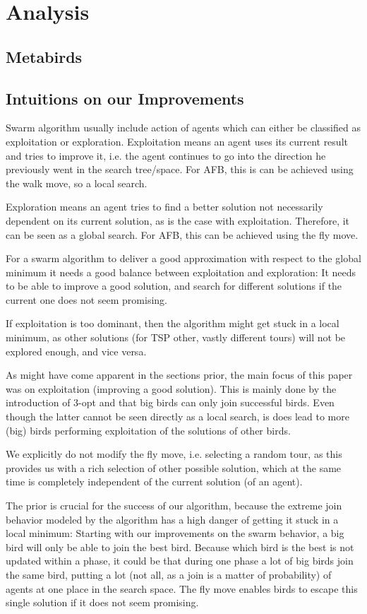 \section{Analysis}
\subsection{Metabirds}
\subsection{Intuitions on our Improvements} \label{Intuitions on our Improvements}
Swarm algorithm usually include action of agents which can either be classified as exploitation or exploration.
Exploitation means an agent uses its current result and tries to improve it, i.e. the agent continues to go into the direction he previously went in the search tree/space.
For AFB, this is can be achieved using the walk move, so a local search.

Exploration means an agent tries to find a better solution not necessarily dependent on its current solution,
as is the case with exploitation. Therefore, it can be seen as a global search. For AFB, this can be achieved using the fly move.


For a swarm algorithm to deliver a good approximation with respect to the global minimum
it needs a good balance between exploitation and exploration:
It needs to be able to improve a good solution,
and search for different solutions if the current one does not seem promising.

If exploitation is too dominant, then the algorithm might get stuck in a local minimum, as other solutions (for TSP other, vastly different tours) will not be explored enough, and vice versa.

As might have come apparent in the sections prior, the main focus of this paper
was on exploitation (improving a good solution).
This is mainly done by the introduction of 3-opt and that big birds can only join successful birds.
Even though the latter cannot be seen directly as a local search, is does lead to more (big) birds performing exploitation of the solutions of other birds.

We explicitly do not modify the fly move, i.e. selecting a random tour, as this provides us with a rich selection of other possible solution, which at the same time is completely independent of the current solution (of an agent).

The prior is crucial for the success of our algorithm, because the extreme join
behavior modeled by the algorithm has a high danger of getting it stuck in a
local minimum: Starting with our improvements on the swarm behavior,
a big bird will only be able to join the best bird. Because which bird is the best
is not updated within a phase, it could be that during one phase a lot of big birds join the same bird,
putting a lot (not all, as a join is a matter of probability) of agents at one place in the search space.
The fly move enables birds to escape this single solution if it does not seem promising.


